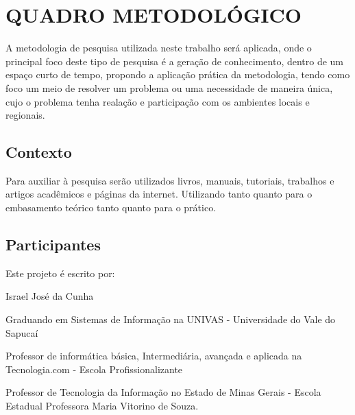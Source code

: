 
\chapter{QUADRO METODOLÓGICO}

%


\par A metodologia de pesquisa utilizada neste trabalho será aplicada, onde o
principal foco deste tipo de pesquisa é a geração de conhecimento, dentro de um
espaço curto de tempo, propondo a aplicação prática da metodologia, tendo como
foco um meio de resolver um problema ou uma necessidade de maneira única, cujo o
problema tenha realação e participação com os ambientes locais e regionais.


		





\section{Contexto}


\par Para auxiliar à pesquisa serão utilizados livros, manuais, tutoriais,
trabalhos e artigos acadêmicos e páginas da internet. Utilizando tanto quanto 
para o embasamento teórico tanto quanto para o prático.


\section{Participantes}

\par Este projeto é escrito por:
\par Israel José da Cunha
\par Graduando em Sistemas de Informação na UNIVAS - Universidade do Vale do
Sapucaí 
\par Professor de informática básica, Intermediária, avançada e aplicada na
Tecnologia.com - Escola Profissionalizante
\par Professor de Tecnologia da Informação no Estado de Minas Gerais - Escola
Estadual Professora Maria Vitorino de Souza.


